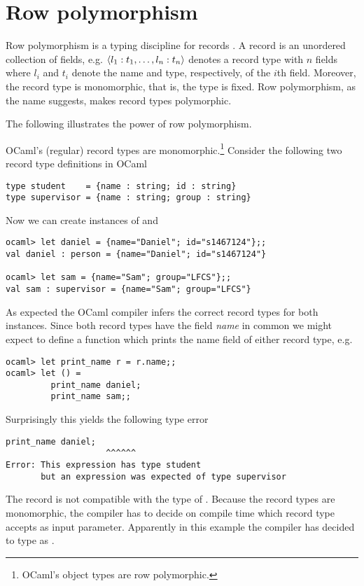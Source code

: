 \section{Row polymorphism}\label{sec:rowpolymorphism}
Row polymorphism is a typing discipline for records \cite{Remy1993}. A record is an unordered collection of fields, e.g. $\langle l_1 : t_1,\dots,l_n : t_n \rangle$ denotes a record type with $n$ fields where $l_i$ and $t_i$ denote the name and type, respectively, of the $i$th field. Moreover, the record type is monomorphic, that is, the type is fixed. Row polymorphism, as the name suggests, makes record types polymorphic.

The following illustrates the power of row polymorphism.
\begin{example}
OCaml's (regular) record types are monomorphic.\footnote{OCaml's object types are row polymorphic.} Consider the following two record type definitions in OCaml
\begin{lstlisting}[style=ocaml]
type student    = {name : string; id : string}
type supervisor = {name : string; group : string} 
\end{lstlisting}
Now we can create instances of  and 
\begin{lstlisting}[style=ocaml]
ocaml> let daniel = {name="Daniel"; id="s1467124"};;
val daniel : person = {name="Daniel"; id="s1467124"}

ocaml> let sam = {name="Sam"; group="LFCS"};;
val sam : supervisor = {name="Sam"; group="LFCS"}
\end{lstlisting}
As expected the OCaml compiler infers the correct record types for both instances. Since both record types have the field \emph{name} in common we might expect to define a function which prints the name field of either record type, e.g.
\begin{lstlisting}[style=ocaml]
ocaml> let print_name r = r.name;;
ocaml> let () = 
         print_name daniel;
         print_name sam;;
\end{lstlisting}
Surprisingly this yields the following type error
\begin{lstlisting}[style=ocaml]
         print_name daniel;
                    ^^^^^^
Error: This expression has type student
       but an expression was expected of type supervisor
\end{lstlisting}
The record  is not compatible with the type of . Because the record types are monomorphic, the compiler has to decide on compile time which record type  accepts as input parameter. Apparently in this example the compiler has decided to type  as .


\end{example}
